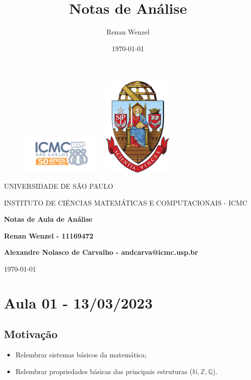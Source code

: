 \documentclass{article}
\title{Notas de An\'alise}
\author{Renan Wenzel}
\date{\today}
\begin{document}
 \begin{figure}[ht]
		\includegraphics[width=4cm]{../icmc.png}
		\hspace{7cm}
		\includegraphics[height=4.9cm,width=4cm]{../brasao_usp_cor.jpg}
	\endminipage	
\end{figure}

\begin{center}
	\vspace{1cm}
	\LARGE
	UNIVERSIDADE DE S\~AO PAULO

	\vspace{1.3cm}
	\LARGE
	INSTITUTO DE CI\^ENCIAS MATEM\'ATICAS E COMPUTACIONAIS - ICMC

	\vspace{1.7cm}
	\Large
	\textbf{Notas de Aula de An\'alise}

	\vspace{1.3cm}
	\large
	\textbf{Renan Wenzel - 11169472}

	\vspace{1.3cm}
	\large
	\textbf{Alexandre Nolasco de Carvalho - andcarva@icmc.usp.br}

	\vspace{1.3cm}
	\today
\end{center}

 \newpage

 \tableofcontents

 \newpage

\section{Aula 01 - 13/03/2023}
\subsection{Motiva\c c\~ao}
\begin{itemize}
  \item Relembrar sistemas b\'asicos da matem\'atica;
  \item Relembrar propriedades b\'asicas das principais estruturas ($\mathbb{N}, \mathbb{Z}, \mathbb{Q}$).
\end{itemize}
\end{document}
